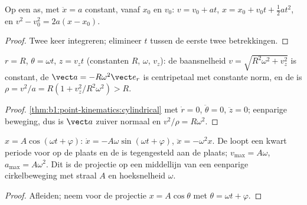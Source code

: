 \begin{proposition}\label{prop:b1:point-kinematics:uarm}
Op een as, met $\ddot x = a$ constant, vanaf $x_0$ en $v_0$:
$v = v_0 + at$, $x = x_0 + v_0t + \tfrac12 at^2$, en
$v^2 - v_0^2 = 2a(x - x_0)$.
\end{proposition}

\begin{proof}
Twee keer integreren; elimineer $t$ tussen de eerste twee betrekkingen.
\end{proof}

\begin{proposition}[Schroeflijnbeweging]\label{prop:b1:point-kinematics:helix}
$r = R$, $\theta = \omega t$, $z = v_zt$ (constanten $R$, $\omega$, $v_z$):
de baansnelheid $v = \sqrt{R^2\omega^2 + v_z^2}$ is constant, de 
$\vect a = -R\omega^2\vect e_r$ is centripetaal met constante norm, en de
 is $\rho = v^2/a = R(1 + v_z^2/R^2\omega^2) > R$.
\end{proposition}

\begin{proof}
\cref{thm:b1:point-kinematics:cylindrical} met $\dot r = 0$,
$\ddot\theta = 0$, $\ddot z = 0$; eenparige beweging, dus is $\vect a$ zuiver
normaal en $v^2/\rho = R\omega^2$.
\end{proof}

\begin{proposition}\label{prop:b1:point-kinematics:harmonic}
$x = A\cos(\omega t + \varphi)$: $\dot x = -A\omega\sin(\omega t + \varphi)$,
$\ddot x = -\omega^2 x$. De  loopt een kwart periode voor op de plaats
en de  is tegengesteld aan de plaats; $v_{\max} =
A\omega$, $a_{\max} = A\omega^2$. Dit is de projectie op een middellijn van
een eenparige cirkelbeweging met straal $A$ en hoeksnelheid $\omega$.
\end{proposition}

\begin{proof}
Afleiden; neem voor de projectie $x = A\cos\theta$ met $\theta =
\omega t + \varphi$.
\end{proof}

